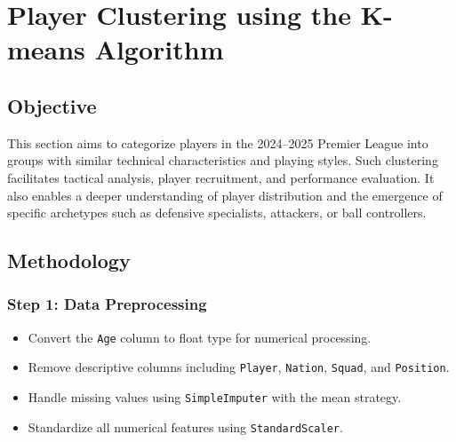 \documentclass[12pt,a4paper]{article}
\begin{document}
\section{Player Clustering using the K-means Algorithm}

\subsection{Objective}
This section aims to categorize players in the 2024–2025 Premier League into groups with similar technical characteristics and playing styles. Such clustering facilitates tactical analysis, player recruitment, and performance evaluation. It also enables a deeper understanding of player distribution and the emergence of specific archetypes such as defensive specialists, attackers, or ball controllers.

\subsection{Methodology}

\subsubsection{Step 1: Data Preprocessing}
\begin{itemize}
    \item Convert the \texttt{Age} column to float type for numerical processing.
    \item Remove descriptive columns including \texttt{Player}, \texttt{Nation}, \texttt{Squad}, and \texttt{Position}.
    \item Handle missing values using \texttt{SimpleImputer} with the mean strategy.
    \item Standardize all numerical features using \texttt{StandardScaler}.
\end{itemize}
\end{document}
